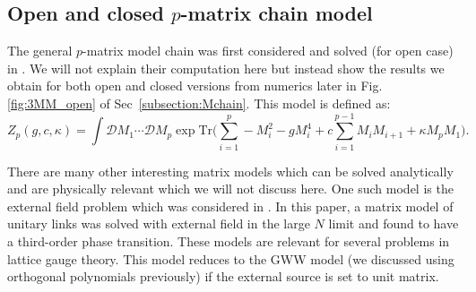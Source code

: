 \documentclass[11pt]{article}
\begin{document}

\subsection{Open and closed $p$-matrix chain model}

The general $p$-matrix model chain was first considered and solved (for open case) in \cite{Chadha:1980ri}. We will not
explain their computation here but instead show the results we obtain for both open and closed versions 
from numerics later in Fig. \ref{fig:3MM_open}
of Sec~\ref{subsection:Mchain}. This model is defined as: 
\begin{equation}
\label{eq:Mehta1} 
Z_{p}(g,c,\kappa) = \int \mathcal{D}M_{1} \cdots  \mathcal{D}M_{p} \exp \mathrm{Tr}\Bigg(\sum_{i=1}^{p} -M_{i}^2  - g M_{i}^{4} + c \sum_{i=1}^{p-1} M_{i}M_{i+1} 
+ \kappa M_{p}M_{1} \Bigg).
\end{equation} 


There are many other interesting matrix models which can be solved analytically
and are physically relevant which we will not discuss here. 
One such model is the external field problem
which was considered in \cite{Brezin:1980rk}. In this paper, a matrix 
model of unitary links was solved with external field in the large $N$ limit and found to
have a third-order phase transition. These models are relevant for several problems in lattice gauge theory. 
This model reduces to the GWW model (we discussed using orthogonal polynomials previously) 
if the external source is set to unit matrix. 
\end{document}
